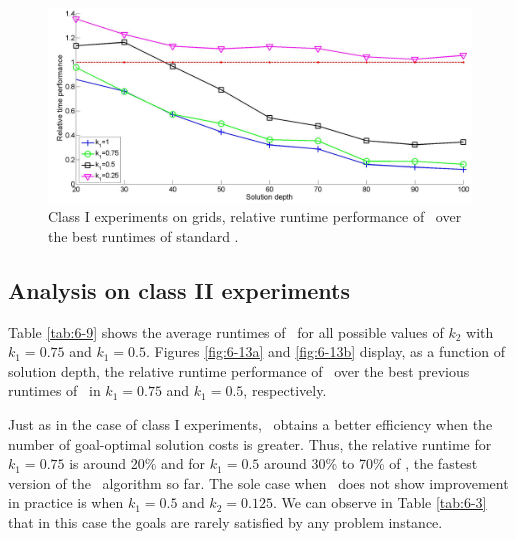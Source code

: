 \begin{figure}%
\centering
\includegraphics[width=1\textwidth]{Images/Chapter6/class1-exe-time-lexgo-te}
\caption{Class I experiments on grids, relative runtime performance of \lexgote \ over the best runtimes of standard \lexgo.}
\label{fig:6-12}
\end{figure}

\subsection{Analysis on class II experiments}
\label{chapEmpiricalAnalysis:subsec:analysisgridslexgotec2}

Table \ref{tab:6-9} shows the average runtimes of \lexgote \ for all possible values of $k_2$ with  $k_1=0.75$ and $k_1=0.5$. Figures \ref{fig:6-13a} and \ref{fig:6-13b} display, as a function of solution depth, the relative runtime performance of \lexgote \ over the best previous runtimes of \lexgo \ in $k_1=0.75$ and $k_1=0.5$, respectively.

Just as in the case of class I experiments, \lexgote \ obtains a better efficiency when the number of goal-optimal solution costs is greater. Thus, the relative runtime for $k_1=0.75$ is around 20\% and for $k_1=0.5$ around 30\% to 70\% of \lexgolin, the fastest version of the \lexgo \ algorithm so far. The sole case when \lexgote \ does not show improvement in practice is when  $k_1=0.5$ and  $k_2=0.125$. We can observe in Table \ref{tab:6-3} that in this case the goals are rarely satisfied by any problem instance.

